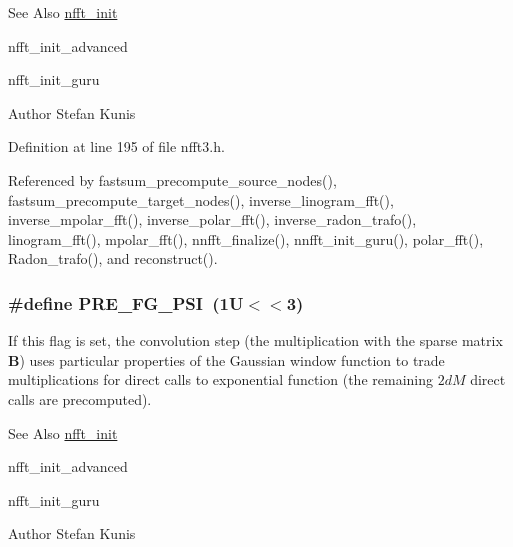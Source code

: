 \begin{DoxySeeAlso}{See Also}
\hyperlink{group__nfft_ga1dfeaf18f3735f035afa62ca768d99c4}{nfft\-\_\-init} 

nfft\-\_\-init\-\_\-advanced 

nfft\-\_\-init\-\_\-guru 
\end{DoxySeeAlso}
\begin{DoxyAuthor}{Author}
Stefan Kunis 
\end{DoxyAuthor}


Definition at line 195 of file nfft3.\-h.



Referenced by fastsum\-\_\-precompute\-\_\-source\-\_\-nodes(), fastsum\-\_\-precompute\-\_\-target\-\_\-nodes(), inverse\-\_\-linogram\-\_\-fft(), inverse\-\_\-mpolar\-\_\-fft(), inverse\-\_\-polar\-\_\-fft(), inverse\-\_\-radon\-\_\-trafo(), linogram\-\_\-fft(), mpolar\-\_\-fft(), nnfft\-\_\-finalize(), nnfft\-\_\-init\-\_\-guru(), polar\-\_\-fft(), Radon\-\_\-trafo(), and reconstruct().

\hypertarget{group__nfft_ga9c5a5ab61009a801082897ca40a1658c}{
\subsubsection[{P\-R\-E\-\_\-\-F\-G\-\_\-\-P\-S\-I}]{\setlength{\rightskip}{0pt plus 5cm}\#define P\-R\-E\-\_\-\-F\-G\-\_\-\-P\-S\-I~(1\-U$<$$<$3)}}\label{group__nfft_ga9c5a5ab61009a801082897ca40a1658c}
If this flag is set, the convolution step (the multiplication with the sparse matrix $\mathbf{B}$) uses particular properties of the Gaussian window function to trade multiplications for direct calls to exponential function (the remaining $2dM$ direct calls are precomputed).

\begin{DoxySeeAlso}{See Also}
\hyperlink{group__nfft_ga1dfeaf18f3735f035afa62ca768d99c4}{nfft\-\_\-init} 

nfft\-\_\-init\-\_\-advanced 

nfft\-\_\-init\-\_\-guru 
\end{DoxySeeAlso}
\begin{DoxyAuthor}{Author}
Stefan Kunis 
\end{DoxyAuthor}


